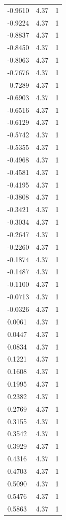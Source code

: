 \begin{longtable}{lrr}
  -0.9610 & 4.37 & 1 \\
  -0.9224 & 4.37 & 1 \\
  -0.8837 & 4.37 & 1 \\
  -0.8450 & 4.37 & 1 \\
  -0.8063 & 4.37 & 1 \\
  -0.7676 & 4.37 & 1 \\
  -0.7289 & 4.37 & 1 \\
  -0.6903 & 4.37 & 1 \\
  -0.6516 & 4.37 & 1 \\
  -0.6129 & 4.37 & 1 \\
  -0.5742 & 4.37 & 1 \\
  -0.5355 & 4.37 & 1 \\
  -0.4968 & 4.37 & 1 \\
  -0.4581 & 4.37 & 1 \\
  -0.4195 & 4.37 & 1 \\
  -0.3808 & 4.37 & 1 \\
  -0.3421 & 4.37 & 1 \\
  -0.3034 & 4.37 & 1 \\
  -0.2647 & 4.37 & 1 \\
  -0.2260 & 4.37 & 1 \\
  -0.1874 & 4.37 & 1 \\
  -0.1487 & 4.37 & 1 \\
  -0.1100 & 4.37 & 1 \\
  -0.0713 & 4.37 & 1 \\
  -0.0326 & 4.37 & 1 \\
  0.0061 & 4.37 & 1 \\
  0.0447 & 4.37 & 1 \\
  0.0834 & 4.37 & 1 \\
  0.1221 & 4.37 & 1 \\
  0.1608 & 4.37 & 1 \\
  0.1995 & 4.37 & 1 \\
  0.2382 & 4.37 & 1 \\
  0.2769 & 4.37 & 1 \\
  0.3155 & 4.37 & 1 \\
  0.3542 & 4.37 & 1 \\
  0.3929 & 4.37 & 1 \\
  0.4316 & 4.37 & 1 \\
  0.4703 & 4.37 & 1 \\
  0.5090 & 4.37 & 1 \\
  0.5476 & 4.37 & 1 \\
  0.5863 & 4.37 & 1 \\

\end{longtable}
